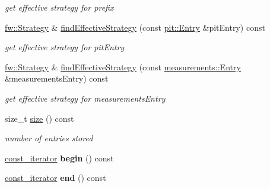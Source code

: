 \begin{DoxyCompactItemize}
\begin{DoxyCompactList}\small\item\em get effective strategy for prefix \end{DoxyCompactList}\item 
\hyperlink{classnfd_1_1fw_1_1Strategy}{fw\+::\+Strategy} \& \hyperlink{classnfd_1_1StrategyChoice_ac81a817d9b21796f59f5ce857745d3a5}{find\+Effective\+Strategy} (const \hyperlink{classnfd_1_1pit_1_1Entry}{pit\+::\+Entry} \&pit\+Entry) const\hypertarget{classnfd_1_1StrategyChoice_ac81a817d9b21796f59f5ce857745d3a5}{}\label{classnfd_1_1StrategyChoice_ac81a817d9b21796f59f5ce857745d3a5}

\begin{DoxyCompactList}\small\item\em get effective strategy for pit\+Entry \end{DoxyCompactList}\item 
\hyperlink{classnfd_1_1fw_1_1Strategy}{fw\+::\+Strategy} \& \hyperlink{classnfd_1_1StrategyChoice_ae65be59dd277efd48abb9dfb9a8f4b0c}{find\+Effective\+Strategy} (const \hyperlink{classnfd_1_1measurements_1_1Entry}{measurements\+::\+Entry} \&measurements\+Entry) const\hypertarget{classnfd_1_1StrategyChoice_ae65be59dd277efd48abb9dfb9a8f4b0c}{}\label{classnfd_1_1StrategyChoice_ae65be59dd277efd48abb9dfb9a8f4b0c}

\begin{DoxyCompactList}\small\item\em get effective strategy for measurements\+Entry \end{DoxyCompactList}\item 
size\+\_\+t \hyperlink{classnfd_1_1StrategyChoice_ac065e824d2513fe358ed724e8b520455}{size} () const\hypertarget{classnfd_1_1StrategyChoice_ac065e824d2513fe358ed724e8b520455}{}\label{classnfd_1_1StrategyChoice_ac065e824d2513fe358ed724e8b520455}

\begin{DoxyCompactList}\small\item\em number of entries stored \end{DoxyCompactList}\item 
\hyperlink{classnfd_1_1StrategyChoice_1_1const__iterator}{const\+\_\+iterator} {\bfseries begin} () const\hypertarget{classnfd_1_1StrategyChoice_a322043a6af35a272948b468febd168fe}{}\label{classnfd_1_1StrategyChoice_a322043a6af35a272948b468febd168fe}

\item 
\hyperlink{classnfd_1_1StrategyChoice_1_1const__iterator}{const\+\_\+iterator} {\bfseries end} () const\hypertarget{classnfd_1_1StrategyChoice_ae3b1e66de4cbcb660421ff22d0565f09}{}\label{classnfd_1_1StrategyChoice_ae3b1e66de4cbcb660421ff22d0565f09}

\end{DoxyCompactItemize}


